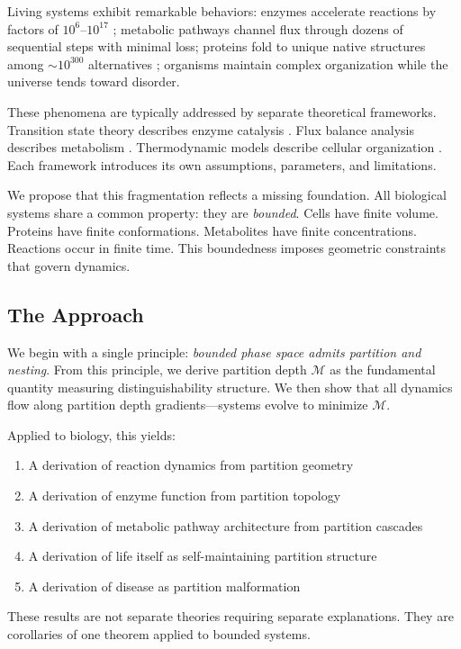 \documentclass[twocolumn,10pt,a4paper]{article}
\theoremstyle{definition}
\theoremstyle{remark}
\newcommand{\Depth}{\mathcal{M}}
\begin{document}
Living systems exhibit remarkable behaviors: enzymes accelerate reactions by factors of $10^{6}$--$10^{17}$ \citep{wolfenden2001}; metabolic pathways channel flux through dozens of sequential steps with minimal loss; proteins fold to unique native structures among $\sim 10^{300}$ alternatives \citep{levinthal1969}; organisms maintain complex organization while the universe tends toward disorder.

These phenomena are typically addressed by separate theoretical frameworks. Transition state theory describes enzyme catalysis \citep{eyring1935}. Flux balance analysis describes metabolism \citep{orth2010}. Thermodynamic models describe cellular organization \citep{schrodinger1944}. Each framework introduces its own assumptions, parameters, and limitations.

We propose that this fragmentation reflects a missing foundation. All biological systems share a common property: they are \emph{bounded}. Cells have finite volume. Proteins have finite conformations. Metabolites have finite concentrations. Reactions occur in finite time. This boundedness imposes geometric constraints that govern dynamics.

\subsection{The Approach}

We begin with a single principle: \emph{bounded phase space admits partition and nesting}. From this principle, we derive partition depth $\Depth$ as the fundamental quantity measuring distinguishability structure. We then show that all dynamics flow along partition depth gradients---systems evolve to minimize $\Depth$.

Applied to biology, this yields:
\begin{enumerate}[label=(\roman*)]
    \item A derivation of reaction dynamics from partition geometry
    \item A derivation of enzyme function from partition topology
    \item A derivation of metabolic pathway architecture from partition cascades
    \item A derivation of life itself as self-maintaining partition structure
    \item A derivation of disease as partition malformation
\end{enumerate}

These results are not separate theories requiring separate explanations. They are corollaries of one theorem applied to bounded systems.
\end{document}
